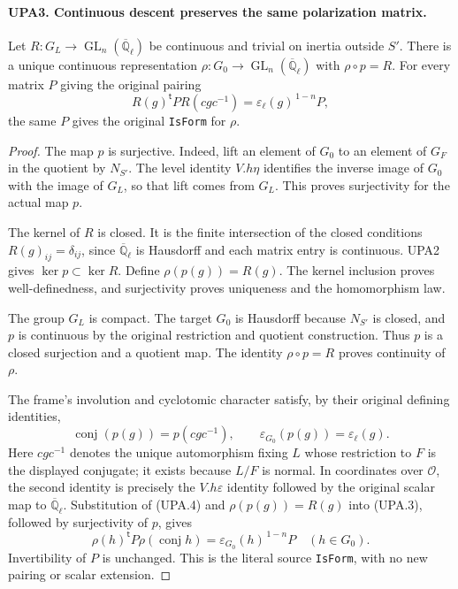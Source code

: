 \paragraph{UPA3. Continuous descent preserves the same polarization matrix.}
\label{claim:UPA3}
Let $R:G_L\to\operatorname{GL}_n(\overline{\mathbb Q}_\ell)$
be continuous and trivial on inertia outside $S'$.
There is a unique continuous representation
$\rho:G_0\to\operatorname{GL}_n(\overline{\mathbb Q}_\ell)$
with $\rho\circ p=R$.
For every matrix $P$ giving the original pairing
\[
 R(g)^{\mathsf t}P R(cgc^{-1})
                =\varepsilon_\ell(g)^{\,1-n}P,
 \tag{UPA.3}
\]
the same $P$ gives the original \texttt{IsForm} for $\rho$.
\begin{proof}
The map $p$ is surjective.  Indeed, lift an element of $G_0$
to an element of $G_F$ in the quotient by $N_{S'}$.
The level identity $V.h\eta$ identifies the inverse image of
$G_0$ with the image of $G_L$, so that lift comes from $G_L$.
This proves surjectivity for the actual map $p$.

The kernel of $R$ is closed.  It is the finite intersection
of the closed conditions $R(g)_{ij}=\delta_{ij}$, since
$\overline{\mathbb Q}_\ell$ is Hausdorff and each matrix entry
is continuous.  UPA2 gives $\ker p\subset\ker R$.
Define $\rho(p(g))=R(g)$.  The kernel inclusion proves
well-definedness, and surjectivity proves uniqueness and the
homomorphism law.

The group $G_L$ is compact.  The target $G_0$ is Hausdorff
because $N_{S'}$ is closed, and $p$ is continuous by the
original restriction and quotient construction.  Thus $p$
is a closed surjection and a quotient map.  The identity
$\rho\circ p=R$ proves continuity of $\rho$.

The frame's involution and cyclotomic character satisfy,
by their original defining identities,
\[
 \operatorname{conj}(p(g))=p(cgc^{-1}),\qquad
 \varepsilon_{G_0}(p(g))=\varepsilon_\ell(g).
 \tag{UPA.4}
\]
Here $cgc^{-1}$ denotes the unique automorphism fixing $L$
whose restriction to $F$ is the displayed conjugate; it
exists because $L/F$ is normal.  In coordinates over
$\mathcal O$, the second identity is precisely the
$V.h\varepsilon$ identity followed by the original scalar
map to $\overline{\mathbb Q}_\ell$.
Substitution of (UPA.4) and $\rho(p(g))=R(g)$ into
(UPA.3), followed by surjectivity of $p$, gives
\[
 \rho(h)^{\mathsf t}P\rho(\operatorname{conj}h)
                   =\varepsilon_{G_0}(h)^{\,1-n}P
 \quad(h\in G_0).
 \tag{UPA.5}
\]
Invertibility of $P$ is unchanged.  This is the literal
source \texttt{IsForm}, with no new pairing or scalar extension.
\end{proof}


